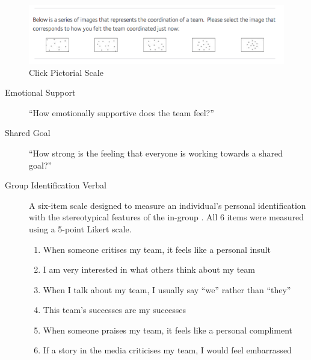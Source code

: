     \begin{figure}[htbp]
      \includegraphics[width = \linewidth]{images/teamClickPictorial.png}
      \caption{Click Pictorial Scale}
      \label{fig:clickPictorial}
    \end{figure}



  \begin{description}
    \item [Emotional Support] ``How emotionally supportive does the team feel?''
    \item [Shared Goal] ``How strong is the feeling that everyone is working towards a shared goal?''
    \item [Group Identification Verbal] A six-item scale designed to measure an individual's personal identification with the stereotypical features of the in-group  \citep{Mael1992}.  All 6 items were measured using a 5-point Likert scale.
          \begin{enumerate}
            \item When someone critises my team, it feels like a personal insult
            \item I am very interested in what others think about my team
            \item When I talk about my team, I usually say ``we'' rather than ``they''
            \item This team's successes are my successes
            \item When someone praises my team, it feels like a personal compliment
            \item If a story in the media criticises my team, I would feel embarrassed
          \end{enumerate}


\end{description}
